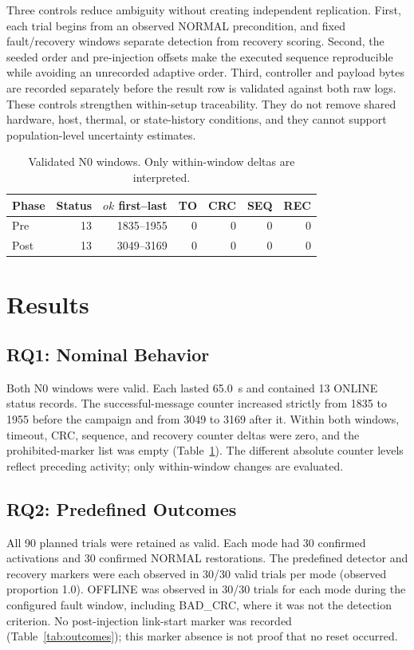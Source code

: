 \documentclass[conference]{IEEEtran}
\begin{document}
Three controls reduce ambiguity without creating independent replication. First, each trial begins from an observed NORMAL precondition, and fixed fault/recovery windows separate detection from recovery scoring. Second, the seeded order and pre-injection offsets make the executed sequence reproducible while avoiding an unrecorded adaptive order. Third, controller and payload bytes are recorded separately before the result row is validated against both raw logs. These controls strengthen within-setup traceability. They do not remove shared hardware, host, thermal, or state-history conditions, and they cannot support population-level uncertainty estimates.

\begin{table}[t]
\caption{Validated N0 windows. Only within-window deltas are interpreted.}
\label{tab:n0}
\centering
\footnotesize
\begin{tabular}{lrrrrrr}
\toprule
Phase & Status & $ok$ first--last & TO & CRC & SEQ & REC \\
\midrule
Pre  & 13 & 1835--1955 & 0 & 0 & 0 & 0 \\
Post & 13 & 3049--3169 & 0 & 0 & 0 & 0 \\
\bottomrule
\end{tabular}
\end{table}

\section{Results}

\subsection{RQ1: Nominal Behavior}

Both N0 windows were valid. Each lasted 65.0~s and contained 13 ONLINE status records. The successful-message counter increased strictly from 1835 to 1955 before the campaign and from 3049 to 3169 after it. Within both windows, timeout, CRC, sequence, and recovery counter deltas were zero, and the prohibited-marker list was empty (Table~\ref{tab:n0}). The different absolute counter levels reflect preceding activity; only within-window changes are evaluated.

\subsection{RQ2: Predefined Outcomes}

All 90 planned trials were retained as valid. Each mode had 30 confirmed activations and 30 confirmed NORMAL restorations. The predefined detector and recovery markers were each observed in 30/30 valid trials per mode (observed proportion 1.0). OFFLINE was observed in 30/30 trials for each mode during the configured fault window, including BAD\_CRC, where it was not the detection criterion. No post-injection link-start marker was recorded (Table~\ref{tab:outcomes}); this marker absence is not proof that no reset occurred.
\end{document}
